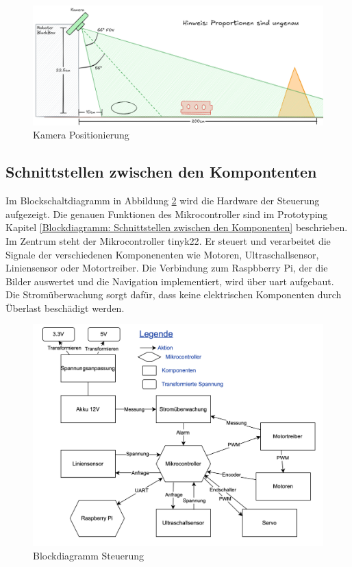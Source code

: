 \begin{figure}[H]
    \centering
    \includegraphics[width=1\linewidth]{assets//informatik-prototyp//camera/camera_position.png}
    \caption{Kamera Positionierung}
    \label{fig:camera-position-concept}
\end{figure}



\newpage

\subsection{Schnittstellen zwischen den Kompontenten}

Im Blockschaltdiagramm in Abbildung \ref{Blockdiagramm Steuerung} wird die Hardware der Steuerung aufgezeigt. Die genauen Funktionen des Mikrocontroller sind im Prototyping Kapitel \ref{Blockdiagramm: Schnittstellen zwischen den Komponenten} beschrieben. Im Zentrum steht der Mikrocontroller \acrshort{tinyk22}.  Er steuert und verarbeitet die Signale der verschiedenen Komponenenten wie Motoren, Ultraschallsensor, Liniensensor oder Motortreiber. Die Verbindung zum Raspbberry Pi, der die Bilder auswertet und die Navigation implementiert,  wird über \acrfull{uart} aufgebaut. Die Stromüberwachung sorgt dafür, dass keine elektrischen Komponenten durch Überlast beschädigt werden.




\begin{figure}[H]
    \centering
    \includegraphics[width=1\linewidth]{img/Blockdiagramm-ET-drawio.drawio-2.png}
    \caption{Blockdiagramm Steuerung}
    \label{Blockdiagramm Steuerung}
\end{figure}


